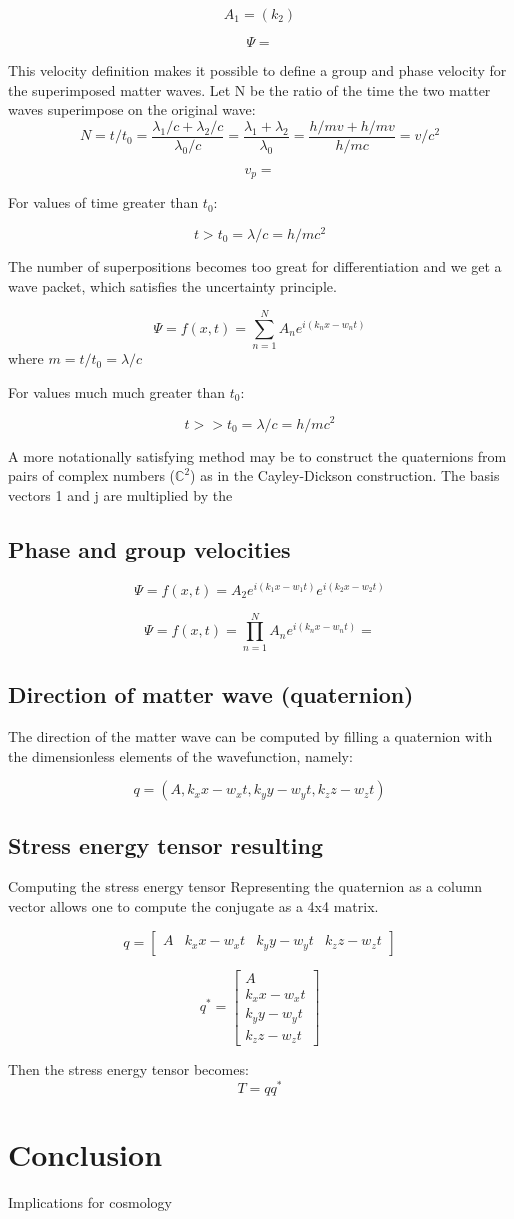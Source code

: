 \documentclass{article}
\begin{document}
$$A_1=(k_2 )$$

$$\Psi=$$

This velocity definition makes it possible to define a group and phase velocity for the superimposed matter waves. Let N be the ratio of the time the two matter waves superimpose on the original wave:
$$N=t/t_0=\frac{\lambda_1/c+\lambda_2/c}{\lambda_0/c}=\frac{\lambda_1+\lambda_2}{\lambda_0}=\frac{h/mv+h/mv}{h/mc}=v/c^2$$

$$v_p=$$

For values of time greater than $t_0$:

$$t>t_0=\lambda /c=h/mc^2$$

The number of superpositions becomes too great for differentiation and we get a wave packet, which satisfies the uncertainty principle.

$$\Psi=f(x,t)=\sum_{n=1}^N{A_n e^{i(k_n x-w_n t)}}$$ 
where $m=t/t_0=\lambda /c $

For values much much greater than $t_0$:

$$t>>t_0=\lambda /c=h/mc^2$$


A more notationally satisfying method may be to construct the quaternions from pairs of complex numbers ($\mathbb{C}^2$) as in the Cayley-Dickson construction. The basis vectors 1 and j are multiplied by the 

\subsection{Phase and group velocities}

$$\Psi=f(x,t)=A_2 e^{i(k_1 x-w_1 t)}e^{i(k_2 x-w_2 t)}$$

$$\Psi=f(x,t)=\prod_{n=1}^N{A_n e^{i(k_n x-w_n t)}}=$$

\subsection{Direction of matter wave (quaternion)}
The direction of the matter wave can be computed by filling a quaternion with the dimensionless elements of the wavefunction, namely:

$$q=(A, k_x x-w_x t, k_y y-w_y t, k_z z-w_z t)$$
\subsection{Stress energy tensor resulting}
Computing the stress energy tensor
Representing the quaternion as a column vector allows one to compute the conjugate as a 4x4 matrix.

$$q=
\left[
\begin{matrix}
A&k_x x-w_x t&k_y y-w_y t&k_z z-w_z t
\end{matrix}
\right]
$$

$$q^*=
\left[
\begin{matrix}
A\\k_x x-w_x t\\k_y y-w_y t\\k_z z-w_z t
\end{matrix}
\right]
$$

Then the stress energy tensor becomes:
$$T=qq^*$$
\section{Conclusion}
Implications for cosmology
\end{document}
